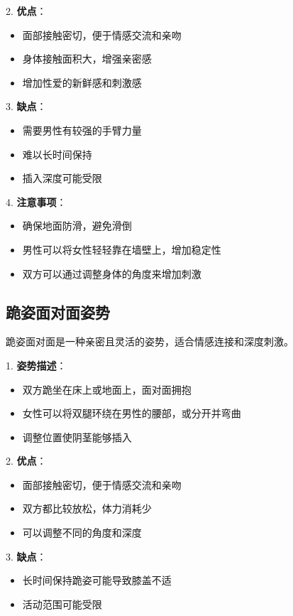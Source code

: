 \documentclass[12pt,UTF8]{ctexbook}
\begin{document}
2. \textbf{优点}：
  \begin{itemize}
  \item 面部接触密切，便于情感交流和亲吻
  \item 身体接触面积大，增强亲密感
  \item 增加性爱的新鲜感和刺激感
  \end{itemize}

3. \textbf{缺点}：
  \begin{itemize}
  \item 需要男性有较强的手臂力量
  \item 难以长时间保持
  \item 插入深度可能受限
  \end{itemize}

4. \textbf{注意事项}：
  \begin{itemize}
  \item 确保地面防滑，避免滑倒
  \item 男性可以将女性轻轻靠在墙壁上，增加稳定性
  \item 双方可以通过调整身体的角度来增加刺激
  \end{itemize}

\subsection{跪姿面对面姿势}

跪姿面对面是一种亲密且灵活的姿势，适合情感连接和深度刺激。

1. \textbf{姿势描述}：
  \begin{itemize}
  \item 双方跪坐在床上或地面上，面对面拥抱
  \item 女性可以将双腿环绕在男性的腰部，或分开并弯曲
  \item 调整位置使阴茎能够插入
  \end{itemize}

2. \textbf{优点}：
  \begin{itemize}
  \item 面部接触密切，便于情感交流和亲吻
  \item 双方都比较放松，体力消耗少
  \item 可以调整不同的角度和深度
  \end{itemize}

3. \textbf{缺点}：
  \begin{itemize}
  \item 长时间保持跪姿可能导致膝盖不适
  \item 活动范围可能受限
  \end{itemize}
\end{document}
